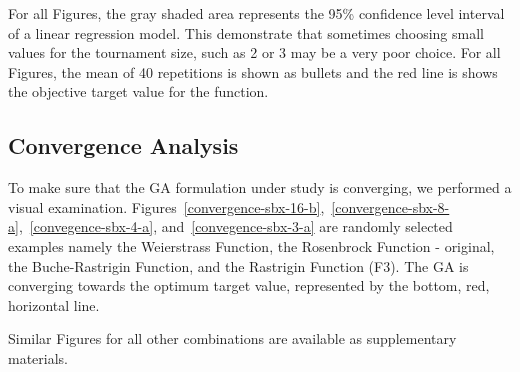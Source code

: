 For all Figures, the gray shaded area represents the 95\% confidence level interval of a linear regression model. This demonstrate that sometimes choosing small values for the tournament size, such as 2 or 3 may be a very poor choice. For all Figures, the mean of 40 repetitions is shown as bullets and the red line is shows the objective target value for the function.


\subsection{Convergence Analysis}

To make sure that the GA formulation under study is converging, we performed a visual examination. Figures~\ref{convergence-sbx-16-b},~\ref{convergence-sbx-8-a},~\ref{convegence-sbx-4-a}, and~\ref{convegence-sbx-3-a} are randomly selected examples namely the Weierstrass Function, the Rosenbrock Function - original, the Buche-Rastrigin Function, and the Rastrigin Function (F3). The GA is converging towards the optimum target value, represented by the bottom, red, horizontal line.

Similar Figures for all other combinations are available as supplementary materials.

